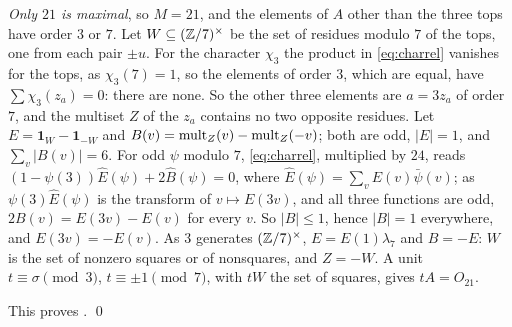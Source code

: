 \emph{Only $21$ is maximal}, so $M=21$, and the elements of $A$ other than
the three tops have order $3$ or $7$. Let $W\subseteq(\mathbb{Z}/7)^{\times}$ be the
set of residues modulo $7$ of the tops, one from each pair $\pm u$. For the
character $\chi_{3}$ the product in \eqref{eq:charrel} vanishes for the
tops, as $\chi_{3}(7)=1$, so the elements of order $3$, which are equal,
have $\sum\chi_{3}(z_{a})=0$: there are none. So the other three elements
are $a=3z_{a}$ of order $7$, and the multiset $Z$ of the $z_{a}$ contains no
two opposite residues. Let $E=\mathbf 1_{W}-\mathbf 1_{-W}$ and
$B(v)=\operatorname{mult}_{Z}(v)-\operatorname{mult}_{Z}(-v)$; both are odd, $|E|=1$, and
$\sum_{v}|B(v)|=6$. For odd $\psi$ modulo $7$, \eqref{eq:charrel},
multiplied by $24$, reads $(1-\psi(3))\hat E(\psi)+2\hat B(\psi)=0$, where
$\hat E(\psi)=\sum_{v}E(v)\bar\psi(v)$; as $\psi(3)\hat E(\psi)$ is the
transform of $v\mapsto E(3v)$, and all three functions are odd,
$2B(v)=E(3v)-E(v)$ for every $v$. So $|B|\le1$, hence $|B|=1$ everywhere,
and $E(3v)=-E(v)$. As $3$ generates $(\mathbb{Z}/7)^{\times}$, $E=E(1)\lambda_{7}$
and $B=-E$: $W$ is the set of nonzero squares or of nonsquares, and $Z=-W$.
A unit $t\equiv\sigma\pmod3$, $t\equiv\pm1\pmod7$, with $tW$ the set of
squares, gives $tA=O_{21}$.

This proves . \qed
